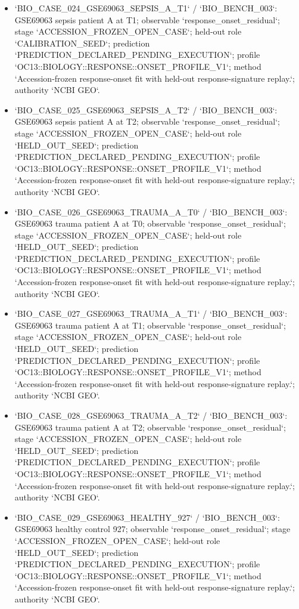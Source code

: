 \begin{itemize}
\item `BIO\_CASE\_024\_GSE69063\_SEPSIS\_A\_T1` / `BIO\_BENCH\_003`: GSE69063 sepsis patient A at T1; observable `response\_onset\_residual`; stage `ACCESSION\_FROZEN\_OPEN\_CASE`; held-out role `CALIBRATION\_SEED`; prediction `PREDICTION\_DECLARED\_PENDING\_EXECUTION`; profile `OC13::BIOLOGY::RESPONSE::ONSET\_PROFILE\_V1`; method `Accession-frozen response-onset fit with held-out response-signature replay.`; authority `NCBI GEO`.
\item `BIO\_CASE\_025\_GSE69063\_SEPSIS\_A\_T2` / `BIO\_BENCH\_003`: GSE69063 sepsis patient A at T2; observable `response\_onset\_residual`; stage `ACCESSION\_FROZEN\_OPEN\_CASE`; held-out role `HELD\_OUT\_SEED`; prediction `PREDICTION\_DECLARED\_PENDING\_EXECUTION`; profile `OC13::BIOLOGY::RESPONSE::ONSET\_PROFILE\_V1`; method `Accession-frozen response-onset fit with held-out response-signature replay.`; authority `NCBI GEO`.
\item `BIO\_CASE\_026\_GSE69063\_TRAUMA\_A\_T0` / `BIO\_BENCH\_003`: GSE69063 trauma patient A at T0; observable `response\_onset\_residual`; stage `ACCESSION\_FROZEN\_OPEN\_CASE`; held-out role `HELD\_OUT\_SEED`; prediction `PREDICTION\_DECLARED\_PENDING\_EXECUTION`; profile `OC13::BIOLOGY::RESPONSE::ONSET\_PROFILE\_V1`; method `Accession-frozen response-onset fit with held-out response-signature replay.`; authority `NCBI GEO`.
\item `BIO\_CASE\_027\_GSE69063\_TRAUMA\_A\_T1` / `BIO\_BENCH\_003`: GSE69063 trauma patient A at T1; observable `response\_onset\_residual`; stage `ACCESSION\_FROZEN\_OPEN\_CASE`; held-out role `HELD\_OUT\_SEED`; prediction `PREDICTION\_DECLARED\_PENDING\_EXECUTION`; profile `OC13::BIOLOGY::RESPONSE::ONSET\_PROFILE\_V1`; method `Accession-frozen response-onset fit with held-out response-signature replay.`; authority `NCBI GEO`.
\item `BIO\_CASE\_028\_GSE69063\_TRAUMA\_A\_T2` / `BIO\_BENCH\_003`: GSE69063 trauma patient A at T2; observable `response\_onset\_residual`; stage `ACCESSION\_FROZEN\_OPEN\_CASE`; held-out role `HELD\_OUT\_SEED`; prediction `PREDICTION\_DECLARED\_PENDING\_EXECUTION`; profile `OC13::BIOLOGY::RESPONSE::ONSET\_PROFILE\_V1`; method `Accession-frozen response-onset fit with held-out response-signature replay.`; authority `NCBI GEO`.
\item `BIO\_CASE\_029\_GSE69063\_HEALTHY\_927` / `BIO\_BENCH\_003`: GSE69063 healthy control 927; observable `response\_onset\_residual`; stage `ACCESSION\_FROZEN\_OPEN\_CASE`; held-out role `HELD\_OUT\_SEED`; prediction `PREDICTION\_DECLARED\_PENDING\_EXECUTION`; profile `OC13::BIOLOGY::RESPONSE::ONSET\_PROFILE\_V1`; method `Accession-frozen response-onset fit with held-out response-signature replay.`; authority `NCBI GEO`.

\end{itemize}

